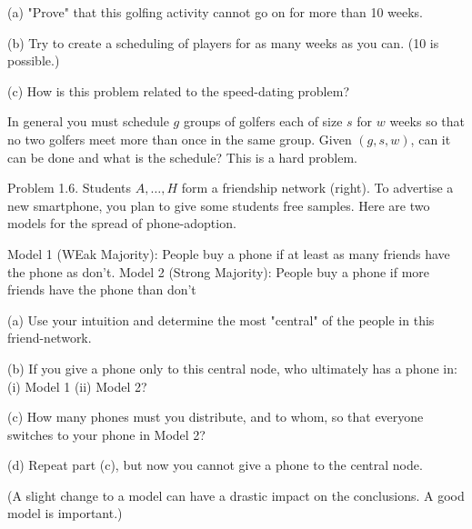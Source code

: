 \documentclass[10pt]{article}
\begin{document}
(a) "Prove" that this golfing activity cannot go on for more than 10 weeks.

(b) Try to create a scheduling of players for as many weeks as you can. (10 is possible.)

(c) How is this problem related to the speed-dating problem?

In general you must schedule $g$ groups of golfers each of size $s$ for $w$ weeks so that no two golfers meet more than once in the same group. Given $(g, s, w)$, can it can be done and what is the schedule? This is a hard problem.

Problem 1.6. Students $A, \ldots, H$ form a friendship network (right). To advertise a new smartphone, you plan to give some students free samples. Here are two models for the spread of phone-adoption.

Model 1 (WEak Majority): People buy a phone if at least as many friends have the phone as don't. Model 2 (Strong Majority): People buy a phone if more friends have the phone than don't

(a) Use your intuition and determine the most "central" of the people in this friend-network.

(b) If you give a phone only to this central node, who ultimately has a phone in: (i) Model 1 (ii) Model 2?

(c) How many phones must you distribute, and to whom, so that everyone switches to your phone in Model 2?

(d) Repeat part (c), but now you cannot give a phone to the central node.

(A slight change to a model can have a drastic impact on the conclusions. A good model is important.)
\end{document}
